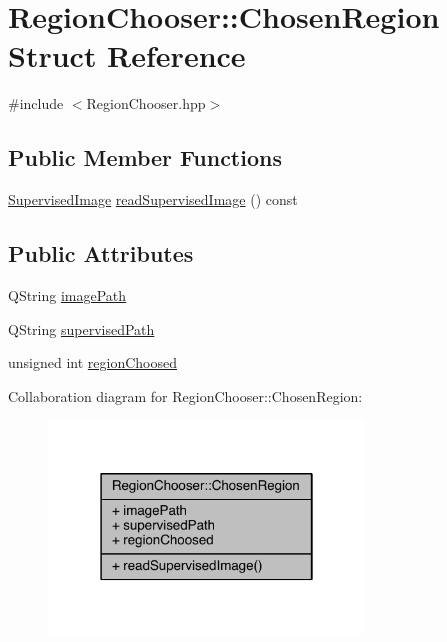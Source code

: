 \hypertarget{struct_region_chooser_1_1_chosen_region}{\section{Region\+Chooser\+:\+:Chosen\+Region Struct Reference}
\label{struct_region_chooser_1_1_chosen_region}
}


{\ttfamily \#include $<$Region\+Chooser.\+hpp$>$}

\subsection*{Public Member Functions}
\begin{DoxyCompactItemize}
\item 
\hyperlink{class_supervised_image}{Supervised\+Image} \hyperlink{struct_region_chooser_1_1_chosen_region_a3147a45fae9b4b6ac60533989ab46038}{read\+Supervised\+Image} () const 
\end{DoxyCompactItemize}
\subsection*{Public Attributes}
\begin{DoxyCompactItemize}
\item 
Q\+String \hyperlink{struct_region_chooser_1_1_chosen_region_a91c6ae294970a8beb4809fe84caa9cd9}{image\+Path}
\item 
Q\+String \hyperlink{struct_region_chooser_1_1_chosen_region_aa9c09ac80e8b0f17b172f11d7040e1d7}{supervised\+Path}
\item 
unsigned int \hyperlink{struct_region_chooser_1_1_chosen_region_aa84ca6499d84eeb7637e264ad6566f53}{region\+Choosed}
\end{DoxyCompactItemize}


Collaboration diagram for Region\+Chooser\+:\+:Chosen\+Region\+:
\nopagebreak
\begin{figure}[H]
\begin{center}
\leavevmode
\includegraphics[width=238pt]{struct_region_chooser_1_1_chosen_region__coll__graph}
\end{center}
\end{figure}


